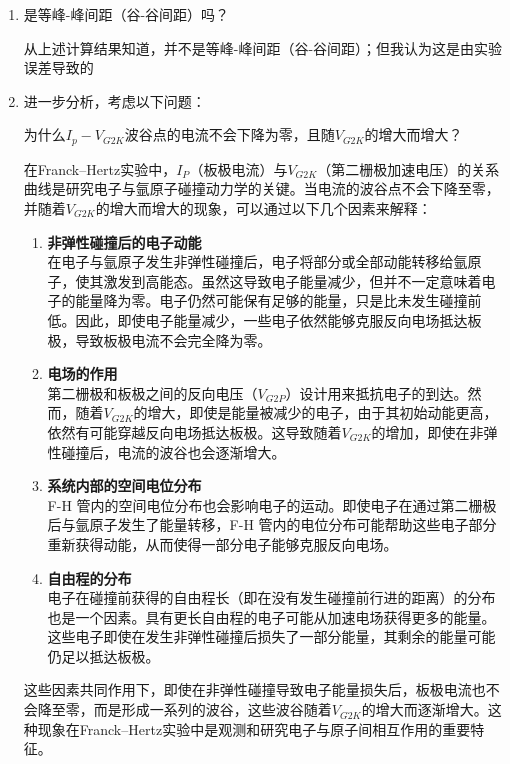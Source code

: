 \documentclass[dvipsnames, svgnames,a4paper,11pt]{article}
\begin{document}
\begin{enumerate}
		\item 是等峰-峰间距（谷-谷间距）吗？
		
		从上述计算结果知道，并不是等峰-峰间距（谷-谷间距）；但我认为这是由实验误差导致的
		
		\item 进一步分析，考虑以下问题：
		\begin{question}
			为什么$I_p-V_{G2K}$波谷点的电流不会下降为零，且随$V_{G2K}$的增大而增大？  
		\end{question}
		在Franck–Hertz实验中，\(I_P\)（板极电流）与\(V_{G2K}\)（第二栅极加速电压）的关系曲线是研究电子与氩原子碰撞动力学的关键。当电流的波谷点不会下降至零，并随着\(V_{G2K}\)的增大而增大的现象，可以通过以下几个因素来解释：
		
		\begin{enumerate}
			\item \textbf{非弹性碰撞后的电子动能} \\
			在电子与氩原子发生非弹性碰撞后，电子将部分或全部动能转移给氩原子，使其激发到高能态。虽然这导致电子能量减少，但并不一定意味着电子的能量降为零。电子仍然可能保有足够的能量，只是比未发生碰撞前低。因此，即使电子能量减少，一些电子依然能够克服反向电场抵达板极，导致板极电流不会完全降为零。
			
			\item \textbf{电场的作用} \\
			第二栅极和板极之间的反向电压（\(V_{G2P}\)）设计用来抵抗电子的到达。然而，随着\(V_{G2K}\)的增大，即使是能量被减少的电子，由于其初始动能更高，依然有可能穿越反向电场抵达板极。这导致随着\(V_{G2K}\)的增加，即使在非弹性碰撞后，电流的波谷也会逐渐增大。
			
			\item \textbf{系统内部的空间电位分布} \\
			F-H 管内的空间电位分布也会影响电子的运动。即使电子在通过第二栅极后与氩原子发生了能量转移，F-H 管内的电位分布可能帮助这些电子部分重新获得动能，从而使得一部分电子能够克服反向电场。
			
			\item \textbf{自由程的分布} \\
			电子在碰撞前获得的自由程长（即在没有发生碰撞前行进的距离）的分布也是一个因素。具有更长自由程的电子可能从加速电场获得更多的能量。这些电子即使在发生非弹性碰撞后损失了一部分能量，其剩余的能量可能仍足以抵达板极。
		\end{enumerate}
		
		这些因素共同作用下，即使在非弹性碰撞导致电子能量损失后，板极电流也不会降至零，而是形成一系列的波谷，这些波谷随着\(V_{G2K}\)的增大而逐渐增大。这种现象在Franck–Hertz实验中是观测和研究电子与原子间相互作用的重要特征。
		
		
	\end{enumerate}
	
\end{document}
